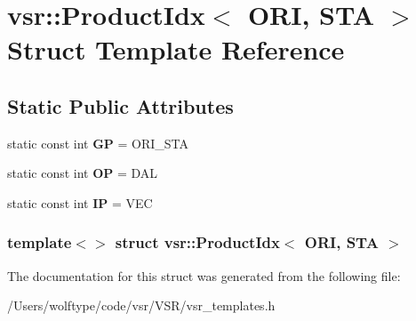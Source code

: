 \hypertarget{structvsr_1_1_product_idx_3_01_o_r_i_00_01_s_t_a_01_4}{\section{vsr\-:\-:Product\-Idx$<$ O\-R\-I, S\-T\-A $>$ Struct Template Reference}
\label{structvsr_1_1_product_idx_3_01_o_r_i_00_01_s_t_a_01_4}
}
\subsection*{Static Public Attributes}
\begin{DoxyCompactItemize}
\item 
\hypertarget{structvsr_1_1_product_idx_3_01_o_r_i_00_01_s_t_a_01_4_af3280c3e03cbc36b6bd974aea2413af9}{static const int {\bfseries G\-P} = O\-R\-I\-\_\-\-S\-T\-A}\label{structvsr_1_1_product_idx_3_01_o_r_i_00_01_s_t_a_01_4_af3280c3e03cbc36b6bd974aea2413af9}

\item 
\hypertarget{structvsr_1_1_product_idx_3_01_o_r_i_00_01_s_t_a_01_4_a6962ee5abd09da0e7f492dac80fa351d}{static const int {\bfseries O\-P} = D\-A\-L}\label{structvsr_1_1_product_idx_3_01_o_r_i_00_01_s_t_a_01_4_a6962ee5abd09da0e7f492dac80fa351d}

\item 
\hypertarget{structvsr_1_1_product_idx_3_01_o_r_i_00_01_s_t_a_01_4_a83686ded405320db9064c86c37ad575f}{static const int {\bfseries I\-P} = V\-E\-C}\label{structvsr_1_1_product_idx_3_01_o_r_i_00_01_s_t_a_01_4_a83686ded405320db9064c86c37ad575f}

\end{DoxyCompactItemize}
\subsubsection*{template$<$$>$ struct vsr\-::\-Product\-Idx$<$ O\-R\-I, S\-T\-A $>$}



The documentation for this struct was generated from the following file\-:\begin{DoxyCompactItemize}
\item 
/\-Users/wolftype/code/vsr/\-V\-S\-R/vsr\-\_\-templates.\-h\end{DoxyCompactItemize}
